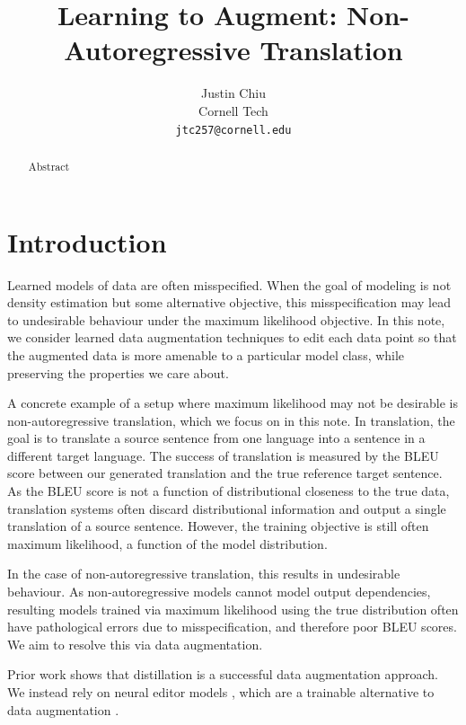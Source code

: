 \documentclass[11pt]{article}
\title{Learning to Augment: Non-Autoregressive Translation}
\author{Justin Chiu \\
  Cornell Tech \\
  \texttt{jtc257@cornell.edu}}
\begin{document}
\maketitle
\begin{abstract}
Abstract
\end{abstract}

\section{Introduction}
Learned models of data are often misspecified.
When the goal of modeling is not density estimation
but some alternative objective, this misspecification may lead to undesirable
behaviour under the maximum likelihood objective.
In this note, we consider learned data augmentation techniques to edit
each data point so that the augmented data is more amenable to a particular model class,
while preserving the properties we care about.

A concrete example of a setup where maximum likelihood may not be desirable is
non-autoregressive translation, which we focus on in this note.
In translation, the goal is to translate a source sentence from one language
into a sentence in a different target language.
The success of translation is measured by the BLEU score
between our generated translation and the true reference target sentence.
As the BLEU score is not a function of distributional closeness to the true data,
translation systems often discard distributional information and
output a single translation of a source sentence.
However, the training objective is still often maximum likelihood, a function of
the model distribution.

In the case of non-autoregressive translation, this results in undesirable behaviour.
As non-autoregressive models cannot model output dependencies,
resulting models trained via maximum likelihood using the true distribution
often have pathological errors due to misspecification,
and therefore poor BLEU scores.
We aim to resolve this via data augmentation.

Prior work shows that distillation is a successful data augmentation approach.
We instead rely on neural editor models \citep{edit},
which are a trainable alternative to data augmentation \citep{recombine}.
\end{document}
